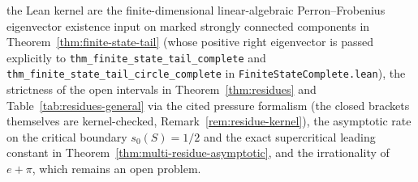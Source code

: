 \documentclass[11pt]{article}
\theoremstyle{definition}
\theoremstyle{remark}
\begin{document}
the Lean kernel are the finite-dimensional linear-algebraic Perron--Frobenius
eigenvector existence input on marked strongly connected components in
Theorem~\ref{thm:finite-state-tail} (whose positive right eigenvector is passed
explicitly to \texttt{thm\_\allowbreak finite\_\allowbreak state\_\allowbreak tail\_\allowbreak complete}
and \texttt{thm\_\allowbreak finite\_\allowbreak state\_\allowbreak tail\_\allowbreak circle\_\allowbreak complete}
in \texttt{FiniteStateComplete.lean}), the strictness of the open intervals in
Theorem~\ref{thm:residues} and Table~\ref{tab:residues-general} via the
cited pressure formalism (the closed brackets themselves are kernel-checked,
Remark~\ref{rem:residue-kernel}), the asymptotic rate on the critical boundary
$s_0(S)=1/2$ and the exact supercritical leading constant in
Theorem~\ref{thm:multi-residue-asymptotic}, and the irrationality of $e+\pi$,
which remains an open problem.
\end{document}
